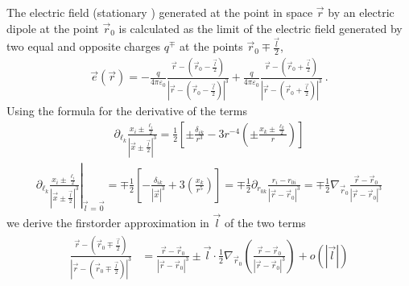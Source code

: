 \documentclass[letterpaper,10pt,english]{jupyterBook}
\begin{document}
\sphinxAtStartPar
The electric field (stationary  ) generated at the point in space \(\vec{r}\) by an electric dipole at the point \(\vec{r}_0\) is calculated as the limit of the electric field generated by two equal and opposite charges \(q^{\mp}\) at the points \(\vec{r}_0 \mp \frac{\vec{l}}{2}\),
\begin{equation*}
\begin{split}\vec{e}(\vec{r}) = -\frac{q}{4 \pi \varepsilon_0} \frac{\vec{r} - \left( \vec{r}_0 - \frac{\vec{l}}{2} \right)}{\left|\vec{r} - \left( \vec{r}_0 - \frac{\vec{l}}{2} \right)\right|^3} + \frac{q}{4 \pi \varepsilon_0} \frac{\vec{r} - \left( \vec{r}_0 + \frac{\vec{l}}{2} \right)}{\left|\vec{r} - \left( \vec{r}_0 + \frac{\vec{l}}{2} \right)\right|^3} \ .\end{split}
\end{equation*}
\sphinxAtStartPar
Using the formula for the derivative of the terms
\begin{equation*}
\begin{split}\partial_{\ell_k} \frac{x_i \pm \frac{\ell_i}{2}}{\left|\vec{x} \pm \frac{\vec{l}}{2} \right|^3} = \frac{1}{2} \left[ \pm \frac{\delta_{ik}}{r^3} - 3 r^{-4} \left( \pm \frac{x_k \pm \frac{\ell_k}{2}}{r} \right) \right]\end{split}
\end{equation*}\begin{equation*}
\begin{split}\left. \partial_{\ell_k} \frac{x_i \pm \frac{\ell_i}{2}}{\left|\vec{x} \pm \frac{\vec{l}}{2} \right|^3} \right|_{\vec{l} = \vec{0}} = \mp \frac{1}{2} \left[ - \frac{\delta_{ik}}{|\vec{x}|^3} + 3 \left( \frac{x_k}{r^5} \right) \right] = \mp \frac{1}{2} \partial_{r_{0 k}} \frac{r_i - r_{0 i}}{|\vec{r} - \vec{r}_0|^3} = \mp \frac{1}{2} \nabla_{\vec{r}_0} \frac{\vec{r} - \vec{r}_0}{|\vec{r} - \vec{r}_0|^3} \end{split}
\end{equation*}
\sphinxAtStartPar
we derive the first\sphinxhyphen{}order approximation in \(\vec{l}\) of the two terms
\begin{equation*}
\begin{split}\begin{aligned}
  \frac{\vec{r} - \left( \vec{r}_0 \mp \frac{\vec{l}}{2} \right)}{\left|\vec{r} - \left( \vec{r}_0 \mp \frac{\vec{l}}{2} \right)\right|^3}
  & = \frac{\vec{r} - \vec{r}_0 }{\left|\vec{r} - \vec{r}_0 \right|^3} \pm \vec{l} \cdot \frac{1}{2} \nabla_{\vec{r}_0} \left( \frac{\vec{r} - \vec{r}_0}{|\vec{r} - \vec{r}_0|^3} \right) + o(|\vec{l}|)\\
\end{aligned}\end{split}
\end{equation*}
\end{document}

